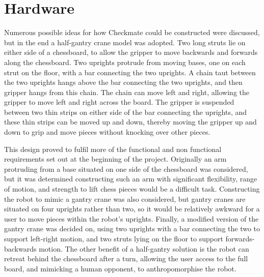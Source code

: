 \documentclass[onecolumn]{IEEEtran}
\begin{document}
\section{Hardware}
Numerous possible ideas for how Checkmate could be constructed were discussed, but in the end a half-gantry crane model was adopted. Two long struts lie on either side of a chessboard, to allow the gripper to move backwards and forwards along the chessboard. Two uprights protrude from moving bases, one on each strut on the floor, with a bar connecting the two uprights. A chain taut between the two uprights hangs above the bar connecting the two uprights, and then gripper hangs from this chain. The chain can move left and right, allowing the gripper to move left and right across the board. The gripper is suspended between two thin strips on either side of the bar connecting the uprights, and these thin strips can be moved up and down, thereby moving the gripper up and down to grip and move pieces without knocking over other pieces. \par
This design proved to fulfil more of the functional and non functional requirements set out at the beginning of the project. Originally an arm protruding from a base situated on one side of the chessboard was considered, but it was determined constructing such an arm with significant flexibility, range of motion, and strength to lift chess pieces would be a difficult task. Constructing the robot to mimic a gantry crane was also considered, but gantry cranes are situated on four uprights rather than two, so it would be relatively awkward for a user to move pieces within the robot's uprights. Finally, a modified version of the gantry crane was decided on, using two uprights with a bar connecting the two to support left-right motion, and two struts lying on the floor to support forwards-backwards motion. The other benefit of a half-gantry solution is the robot can retreat behind the chessboard after a turn, allowing the user access to the full board, and mimicking a human opponent, to anthropomorphise the robot. \par
\end{document}
